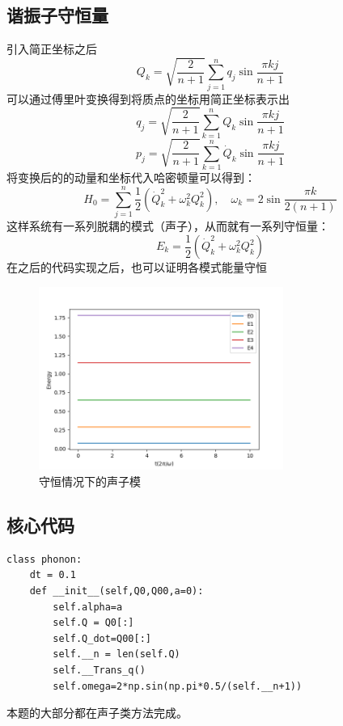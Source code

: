 \documentclass[a4paper]{ctexart}
\begin{document}
\subsection{谐振子守恒量}
引入简正坐标之后
\begin{equation}
Q_{k}=\sqrt{\frac{2}{n+1}} \sum_{j=1}^{n} q_{j} \sin \frac{\pi k j}{n+1}
\end{equation}
可以通过傅里叶变换得到将质点的坐标用简正坐标表示出
\begin{equation}
q_{j}=\sqrt{\frac{2}{n+1}} \sum_{k=1}^{n} Q_{k} \sin \frac{\pi k j}{n+1}
\end{equation}
\begin{equation}
p_{j}=\sqrt{\frac{2}{n+1}} \sum_{k=1}^{n} \dot{Q}_{k} \sin \frac{\pi k j}{n+1}
\end{equation}
将变换后的的动量和坐标代入哈密顿量可以得到：
\begin{equation}
H_{0}=\sum_{j=1}^{n} \frac{1}{2}\left(\dot{Q}_{k}^{2}+\omega_{k}^{2} Q_{k}^{2}\right), \quad \omega_{k}=2 \sin \frac{\pi k}{2(n+1)}
\end{equation}
这样系统有一系列脱耦的模式（声子），从而就有一系列守恒量：
\begin{equation}
E_{k}=\frac{1}{2}\left(\dot{Q}_{k}^{2}+\omega_{k}^{2} Q_{k}^{2}\right)
\end{equation}
在之后的代码实现之后，也可以证明各模式能量守恒
\begin{figure}[hbt]
	\centering
	\includegraphics[width=8cm]{./fig/Prob3_1.png}
	\caption{守恒情况下的声子模}
\end{figure}
\subsection{核心代码}
\begin{lstlisting}
class phonon:
	dt = 0.1
	def __init__(self,Q0,Q00,a=0):
		self.alpha=a
		self.Q = Q0[:]
		self.Q_dot=Q00[:]
		self.__n = len(self.Q)
		self.__Trans_q()
		self.omega=2*np.sin(np.pi*0.5/(self.__n+1))
\end{lstlisting}
本题的大部分都在声子类方法完成。
\end{document}
